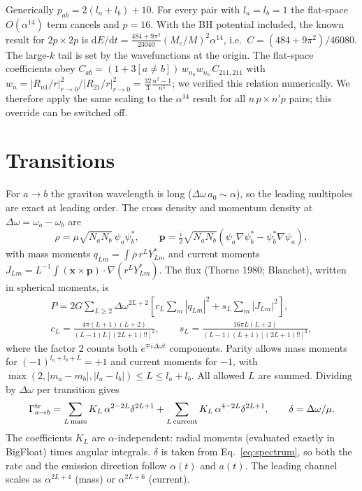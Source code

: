 \documentclass[11pt]{article}
\newcommand{\dd}{\mathrm{d}}
\begin{document}
Generically $p_{ab}=2(l_a+l_b)+10$. For every pair with $l_a=l_b=1$ the flat-space $O(\alpha^{14})$ term cancels and $p=16$. With the BH potential included, the known result for $2p\times2p$ is $\dd E/\dd t=\frac{484+9\pi^2}{23040}(M_c/M)^2\alpha^{14}$, i.e.\ $C=(484+9\pi^2)/46080$. The large-$k$ tail is set by the wavefunctions at the origin. The flat-space coefficients obey $C_{ab}=(1+3[a\neq b])\,w_{n_a}w_{n_b}\,C_{211,211}$ with $w_n=|R_{n1}/r|^2_{r\to0}/|R_{21}/r|^2_{r\to0}=\frac{32}{3}\frac{n^2-1}{n^5}$; we verified this relation numerically. We therefore apply the same scaling to the $\alpha^{14}$ result for all $n\,p\times n'p$ pairs; this override can be switched off.

\section{Transitions}
For $a\to b$ the graviton wavelength is long ($\Delta\omega\, a_0\sim\alpha$), so the leading multipoles are exact at leading order. The cross density and momentum density at $\Delta\omega=\omega_a-\omega_b$ are
\begin{equation}
\rho=\mu\sqrt{N_aN_b}\,\psi_a\psi_b^*,\qquad \mathbf p=\tfrac{i}{2}\sqrt{N_aN_b}\left(\psi_a\nabla\psi_b^*-\psi_b^*\nabla\psi_a\right),
\end{equation}
with mass moments $q_{Lm}=\int\rho\, r^LY^*_{Lm}$ and current moments $J_{Lm}=L^{-1}\int(\mathbf x\times\mathbf p)\cdot\nabla(r^LY^*_{Lm})$. The flux (Thorne 1980; Blanchet), written in spherical moments, is
\begin{gather}
P=2G\sum_{L\ge2}\Delta\omega^{2L+2}\left[c_L\sum_m|q_{Lm}|^2+s_L\sum_m|J_{Lm}|^2\right],\\
c_L=\frac{4\pi(L+1)(L+2)}{(L-1)L[(2L+1)!!]^2},\qquad s_L=\frac{16\pi L(L+2)}{(L-1)(L+1)[(2L+1)!!]^2},
\end{gather}
where the factor 2 counts both $e^{\mp i\Delta\omega t}$ components. Parity allows mass moments for $(-1)^{l_a+l_b+L}=+1$ and current moments for $-1$, with $\max(2,|m_a-m_b|,|l_a-l_b|)\le L\le l_a+l_b$. All allowed $L$ are summed. Dividing by $\Delta\omega$ per transition gives
\begin{equation}
\Gamma^{\rm tr}_{a\to b}=\sum_{L\,\rm mass}K_L\,\alpha^{2-2L}\delta^{2L+1}+\sum_{L\,\rm current}K_L\,\alpha^{4-2L}\delta^{2L+1},\qquad \delta=\Delta\omega/\mu .
\end{equation}
The coefficients $K_L$ are $\alpha$-independent: radial moments (evaluated exactly in BigFloat) times angular integrals. $\delta$ is taken from Eq.~\eqref{eq:spectrum}, so both the rate and the emission direction follow $\alpha(t)$ and $a(t)$. The leading channel scales as $\alpha^{2L+4}$ (mass) or $\alpha^{2L+6}$ (current).
\end{document}
